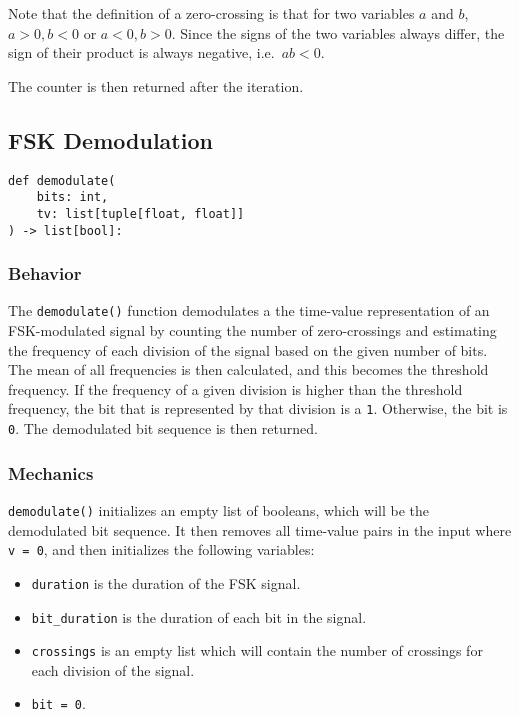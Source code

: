 \documentclass{article}
\begin{document}
				Note that the definition of a zero-crossing is that for two variables \(a\) and \(b\), \(a > 0, b < 0\) or
				\(a < 0, b > 0\). Since the signs of the two variables always differ, the sign of their product is always
				negative, i.e.\ \(ab < 0\).

				The counter is then returned after the iteration.

			\pagebreak



		\subsection{FSK Demodulation}
			\begin{verbatim}
def demodulate(
	bits: int,
	tv: list[tuple[float, float]]
) -> list[bool]:
			\end{verbatim}

			\subsubsection{Behavior}
				The \verb|demodulate()| function demodulates a the time-value representation of an FSK-modulated signal by counting
				the number of zero-crossings and estimating the frequency of each division of the signal based on the given number of
				bits. The mean of all frequencies is then calculated, and this becomes the threshold frequency. If the frequency of a
				given division is higher than the threshold frequency, the bit that is represented by that division is a \verb|1|.
				Otherwise, the bit is \verb|0|. The demodulated bit sequence is then returned.

			\subsubsection{Mechanics}
				\verb|demodulate()| initializes an empty list of booleans, which will be the demodulated bit sequence. It then removes
				all time-value pairs in the input where \verb|v = 0|, and then initializes the following variables:

				\begin{itemize}
					\item \verb|duration| is the duration of the FSK signal.
					\item \verb|bit_duration| is the duration of each bit in the signal.
					\item \verb|crossings| is an empty list which will contain the number of crossings for each division of the signal.
					\item \verb|bit = 0|.
				\end{itemize}
\end{document}
